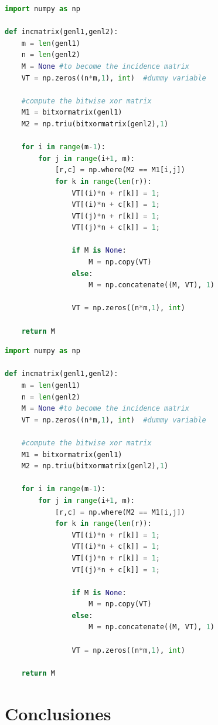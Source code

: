 \documentclass[a4paper, 11pt]{article}
\begin{document}
\begin{lstlisting}[language=Python, caption=experimentación python]
import numpy as np
    
def incmatrix(genl1,genl2):
    m = len(genl1)
    n = len(genl2)
    M = None #to become the incidence matrix
    VT = np.zeros((n*m,1), int)  #dummy variable
    
    #compute the bitwise xor matrix
    M1 = bitxormatrix(genl1)
    M2 = np.triu(bitxormatrix(genl2),1) 

    for i in range(m-1):
        for j in range(i+1, m):
            [r,c] = np.where(M2 == M1[i,j])
            for k in range(len(r)):
                VT[(i)*n + r[k]] = 1;
                VT[(i)*n + c[k]] = 1;
                VT[(j)*n + r[k]] = 1;
                VT[(j)*n + c[k]] = 1;
                
                if M is None:
                    M = np.copy(VT)
                else:
                    M = np.concatenate((M, VT), 1)
                
                VT = np.zeros((n*m,1), int)
    
    return M
\end{lstlisting}

\begin{lstlisting}[language=Python, caption=Python example]
import numpy as np
    
def incmatrix(genl1,genl2):
    m = len(genl1)
    n = len(genl2)
    M = None #to become the incidence matrix
    VT = np.zeros((n*m,1), int)  #dummy variable
    
    #compute the bitwise xor matrix
    M1 = bitxormatrix(genl1)
    M2 = np.triu(bitxormatrix(genl2),1) 

    for i in range(m-1):
        for j in range(i+1, m):
            [r,c] = np.where(M2 == M1[i,j])
            for k in range(len(r)):
                VT[(i)*n + r[k]] = 1;
                VT[(i)*n + c[k]] = 1;
                VT[(j)*n + r[k]] = 1;
                VT[(j)*n + c[k]] = 1;
                
                if M is None:
                    M = np.copy(VT)
                else:
                    M = np.concatenate((M, VT), 1)
                
                VT = np.zeros((n*m,1), int)
    
    return M
\end{lstlisting}

\pagebreak

\section{Conclusiones}
\end{document}
